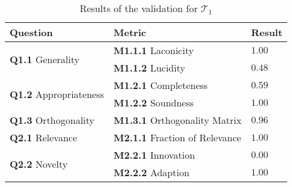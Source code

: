 \begin{table}[t]
\centering
\begin{tabular}{@{}lll@{}}
\toprule
\textbf{Question} & \textbf{Metric} & \textbf{Result}\\ 
    \midrule
    \multirow{2}{*}{\textbf{Q1.1} Generality} & \textbf{M1.1.1} Laconicity & $1.00$ \\
    & \textbf{M1.1.2} Lucidity & $0.48$ \\ 
    
    \multirow{2}{*}{\textbf{Q1.2} Appropriateness} & \textbf{M1.2.1} Completeness & $0.59$ \\
    & \textbf{M1.2.2} Soundness & $1.00$ \\ 
    
    \textbf{Q1.3} Orthogonality & \textbf{M1.3.1} Orthogonality Matrix & $0.96$\\

    \textbf{Q2.1} Relevance & \textbf{M2.1.1} Fraction of Relevance & $1.00$ \\
    
    \multirow{2}{*}{\textbf{Q2.2} Novelty} & \textbf{M2.2.1} Innovation & $0.00$\\
    & \textbf{M2.2.2} Adaption & $1.00$\\
    \bottomrule
\end{tabular}%
\caption[Validation Results of the first Taxonomy Increment]{Results of the validation for $\mathcal{T}_1$}
\label{tab:validation_t1}
\end{table}

